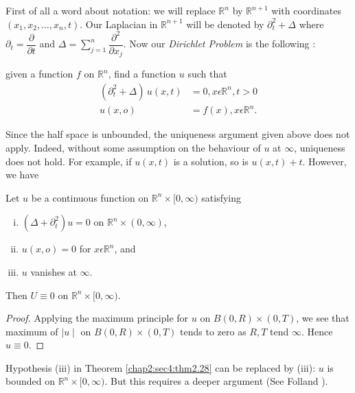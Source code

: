 First of all a word about notation: we will replace $\mathbb{R}^n$ by
$\mathbb{R}^{n+1}$ with coordinates $(x_1, x_2, \ldots, x_n,t)$. Our
Laplacian in $\mathbb{R}^{n+1}$ will be denoted by $\partial^2_t +
\Delta$  where $\partial_t= \dfrac{\partial}{\partial t}$ and $\Delta
= \sum\limits^{n}_{j=1} \dfrac{\partial^2}{\partial x_j}$. Now our
\textit{Dirichlet Problem} is the following :  

given a function $f$ on $\mathbb{R}^n$, find a function $u$ such that
\begin{align*}
  (\partial^2_t + \Delta)\, u (x, t) & = 0, x \epsilon \mathbb{R}^n, t
  > 0 \tag{2.27}\label{chap2:sec4:eq2.27} \\
  u(x,o) & = f(x), x \epsilon \mathbb{R}^n.
\end{align*}\pageoriginale

Since the half space is unbounded, the uniqueness argument given above
does not apply. Indeed, without some assumption on the behaviour of
$u$ at $\infty$, uniqueness does not hold. For example, if $u(x,t)$ is
a solution, so is $u(x,t)+t$. However, we have 

\setcounter{thm}{27}
\begin{thm}\label{chap2:sec4:thm2.28}%
  Let $u$ be a continuous function on $\mathbb{R}^n \times[0,\infty)$
    satisfying  
    \begin{enumerate}[i)]
    \item $(\Delta + \partial^2_t) u=0$ on $\mathbb{R}^n \times (0, \infty)$,
    \item $u(x,o)=0$ for $ x \epsilon \mathbb{R}^n$, and
    \item $u$ vanishes at $\infty$.
    \end{enumerate}
     Then $U\equiv 0$ on $\mathbb{R}^n \times [0, \infty)$.
 \end{thm} 

\begin{proof}%
Applying the maximum principle for $u$ on $B(0,R) \times (0,T)$, we see
that maximum of $\mid u \mid $ on $B(0,R) \times (0, T)$ tends to zero as
$R,T$ tend $\infty$. Hence $u\equiv 0$. 
\end{proof} 
\setcounter{rem}{28}
\begin{rem} \label{chap2:sec4:rem2.29}%
Hypothesis (iii) in Theorem \ref{chap2:sec4:thm2.28} can be replaced by (iii): $u$ is
bounded on $\mathbb{R}^n \times [0, \infty)$. But this requires a deeper
  argument (See Folland \cite{1}). 
 \end{rem} 
 
